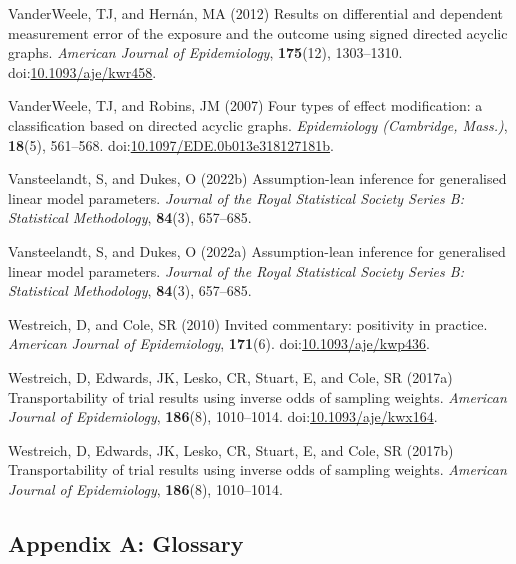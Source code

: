 \documentclass[
  single column]{article}
\newlength{\cslhangindent}
\newenvironment{CSLReferences}[2] %
 {\begin{list}{}{%
  \setlength{\itemindent}{0pt}
  \setlength{\leftmargin}{0pt}
  \setlength{\parsep}{0pt}
  \ifodd #1
   \setlength{\leftmargin}{\cslhangindent}
   \setlength{\itemindent}{-1\cslhangindent}
  \fi
  \setlength{\itemsep}{#2\baselineskip}}}
 {\end{list}}
\begin{document}
\begin{CSLReferences}{1}{0}
VanderWeele, TJ, and Hernán, MA (2012) Results on differential and
dependent measurement error of the exposure and the outcome using signed
directed acyclic graphs. \emph{American Journal of Epidemiology},
\textbf{175}(12), 1303--1310.
doi:\href{https://doi.org/10.1093/aje/kwr458}{10.1093/aje/kwr458}.

VanderWeele, TJ, and Robins, JM (2007) Four types of effect
modification: a classification based on directed acyclic graphs.
\emph{Epidemiology (Cambridge, Mass.)}, \textbf{18}(5), 561--568.
doi:\href{https://doi.org/10.1097/EDE.0b013e318127181b}{10.1097/EDE.0b013e318127181b}.

Vansteelandt, S, and Dukes, O (2022b) Assumption-lean inference for
generalised linear model parameters. \emph{Journal of the Royal
Statistical Society Series B: Statistical Methodology}, \textbf{84}(3),
657--685.

Vansteelandt, S, and Dukes, O (2022a) Assumption-lean inference for
generalised linear model parameters. \emph{Journal of the Royal
Statistical Society Series B: Statistical Methodology}, \textbf{84}(3),
657--685.

Westreich, D, and Cole, SR (2010) Invited commentary: positivity in
practice. \emph{American Journal of Epidemiology}, \textbf{171}(6).
doi:\href{https://doi.org/10.1093/aje/kwp436}{10.1093/aje/kwp436}.

Westreich, D, Edwards, JK, Lesko, CR, Stuart, E, and Cole, SR (2017a)
Transportability of trial results using inverse odds of sampling
weights. \emph{American Journal of Epidemiology}, \textbf{186}(8),
1010--1014.
doi:\href{https://doi.org/10.1093/aje/kwx164}{10.1093/aje/kwx164}.

Westreich, D, Edwards, JK, Lesko, CR, Stuart, E, and Cole, SR (2017b)
Transportability of trial results using inverse odds of sampling
weights. \emph{American Journal of Epidemiology}, \textbf{186}(8),
1010--1014.

\end{CSLReferences}

\newpage{}

\subsection{Appendix A: Glossary}\label{id-app-a}
\end{document}
